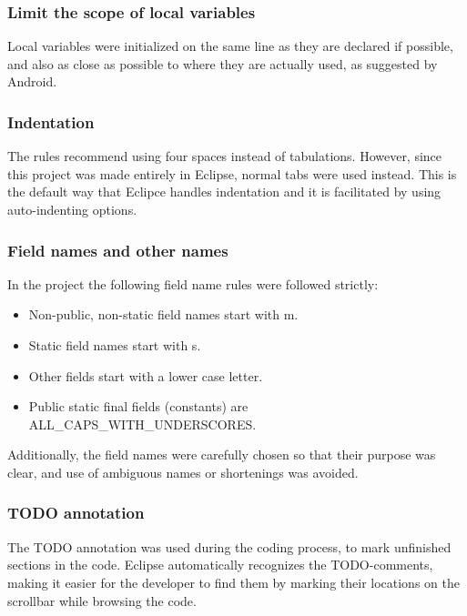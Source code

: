 \subsubsection{Limit the scope of local variables}

Local variables were initialized on the same line as they are declared if possible, and also as close as possible to where they are actually used, as suggested by Android.

\subsubsection{Indentation}

The rules recommend using four spaces instead of tabulations. However, since this project was made entirely in Eclipse, normal tabs were used instead. This is the default way that Eclipce handles indentation and it is facilitated by using auto-indenting options.

\subsubsection{Field names and other names}

In the project the following field name rules were followed strictly:

\begin{itemize}

\item Non-public, non-static field names start with m.
\item Static field names start with s.
\item Other fields start with a lower case letter.
\item Public static final fields (constants) are ALL\_CAPS\_WITH\_UNDERSCORES.

\end{itemize}

Additionally, the field names were carefully chosen so that their purpose was clear, and use of ambiguous names or shortenings was avoided.

\subsubsection{TODO annotation}

The TODO annotation was used during the coding process, to mark unfinished sections in the code. Eclipse automatically recognizes the TODO-comments, making it easier for the developer to find them by marking their locations on the scrollbar while browsing the code.

